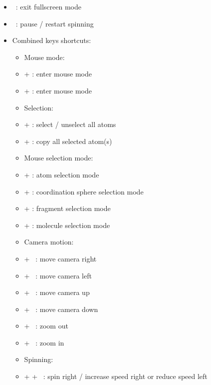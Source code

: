 {\begin{itemize}
\item[] \Esc\ : exit fullscreen mode
\item[] \Spacebar\ : pause / restart spinning
\newpage
\item Combined keys shortcuts:
\begin{itemize}
\item Mouse mode:
\item[] \Alt +  : enter mouse  mode
\item[] \Alt +  : enter mouse  mode \\
\item Selection:
\item[] \Ctrl +  : select / unselect all atoms
\item[] \Ctrl +  : copy all selected atom(s)
\item Mouse selection mode:
\item[] \Shift +  : atom selection mode
\item[] \Shift +  : coordination sphere selection mode
\item[] \Shift +  : fragment selection mode
\item[] \Shift +  : molecule selection mode \\	
\item Camera motion:
\item[] \Ctrl + \RArrow\ : move camera right
\item[] \Ctrl + \LArrow\ : move camera left
\item[] \Ctrl + \UArrow\ : move camera up
\item[] \Ctrl + \DArrow\ : move camera down
\item[] \Shift + \UArrow\ : zoom out
\item[] \Shift + \DArrow\ : zoom in \\
\item Spinning: 
\item[] \Ctrl + \Shift + \RArrow\ : spin right / increase speed right or reduce speed left

\end{itemize}
\end{itemize}}
